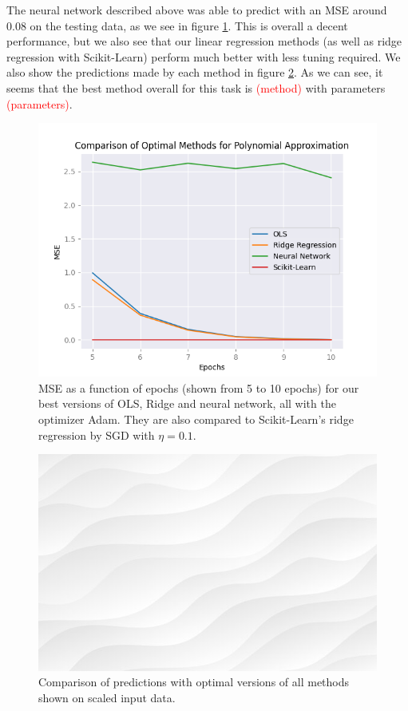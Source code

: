 The neural network described above was able to predict with an MSE around 0.08 on the testing data, as we see in figure \ref{fig:numericalprediction}. This is overall a decent performance, but we also see that our linear regression methods (as well as ridge regression with Scikit-Learn) perform much better with less tuning required. We also show the predictions made by each method in figure \ref{fig:predictioncomparison}. As we can see, it seems that the best method overall for this task is \textcolor{red}{(method)} with parameters \textcolor{red}{(parameters)}. 
\begin{figure}
    \centering
    \includegraphics[width=\linewidth]{figures/all_plots/numericalprediction.png}
    \caption{MSE as a function of epochs (shown from 5 to 10 epochs) for our best versions of OLS, Ridge and neural network, all with the optimizer Adam. They are also compared to Scikit-Learn's ridge regression by SGD with $\eta = 0.1$.}
    \label{fig:numericalprediction}
\end{figure}

\begin{figure}
    \centering
    \includegraphics[width=\linewidth]{figures/placeholders/predictioncomparison.png}
    \caption{Comparison of predictions with optimal versions of all methods shown on scaled input data.}
    \label{fig:predictioncomparison}
\end{figure}

